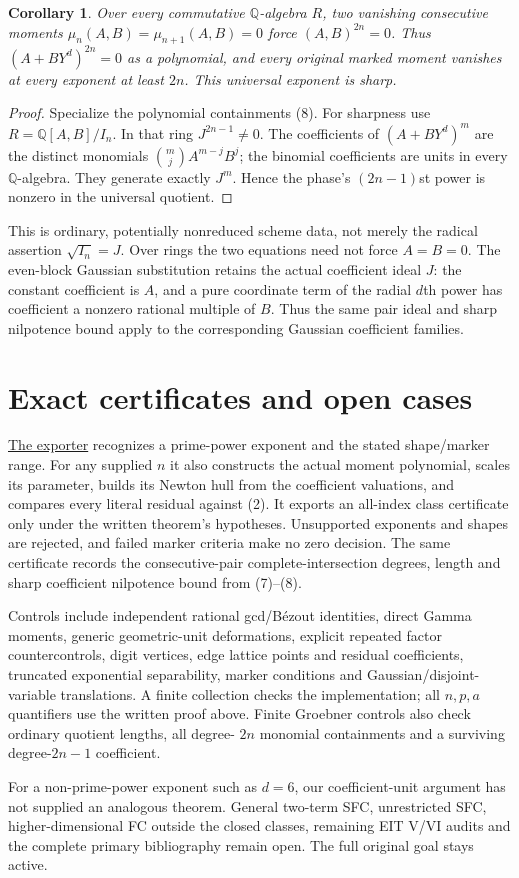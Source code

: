 \documentclass[11pt]{article}
\newtheorem{corollary}[theorem]{Corollary}
\newcommand{\Q}{\mathbb Q}
\begin{document}
\begin{corollary}\label{cor:ordinary}
Over every commutative $\Q$-algebra $R$, two vanishing consecutive moments
$\mu_n(A,B)=\mu_{n+1}(A,B)=0$ force $(A,B)^{2n}=0$.
Thus $(A+BY^d)^{2n}=0$ as a polynomial, and every original marked moment
vanishes at every exponent at least $2n$. This universal exponent is sharp.
\end{corollary}
\begin{proof}
Specialize the polynomial containments (8). For sharpness use
$R=\Q[A,B]/I_n$. In that ring $J^{2n-1}\ne0$. The coefficients of
$(A+BY^d)^m$ are the distinct monomials
$\binom mj A^{m-j}B^j$; the binomial coefficients are units in every
$\Q$-algebra. They generate exactly $J^m$. Hence the phase's
$(2n-1)$st power is nonzero in the universal quotient.
\end{proof}

This is ordinary, potentially nonreduced scheme data, not merely the
radical assertion $\sqrt{I_n}=J$. Over rings the two equations need not
force $A=B=0$. The even-block Gaussian substitution retains the actual
coefficient ideal $J$: the constant coefficient is $A$, and a pure
coordinate term of the radial $d$th power has coefficient a nonzero
rational multiple of $B$. Thus the same pair ideal and sharp nilpotence
bound apply to the corresponding Gaussian coefficient families.

\section{Exact certificates and open cases}
\href{prime_power_windows.py}{The exporter} recognizes a prime-power
exponent and the stated shape/marker range. For any supplied $n$ it also
constructs the actual moment polynomial, scales its parameter, builds
its Newton hull from the coefficient valuations, and compares every
literal residual against (2). It exports an all-index class certificate
only under the written theorem's hypotheses. Unsupported exponents and
shapes are rejected, and failed marker criteria make no zero decision.
The same certificate records the consecutive-pair complete-intersection
degrees, length and sharp coefficient nilpotence bound from (7)--(8).

Controls include independent rational gcd/B\'ezout identities, direct
Gamma moments, generic geometric-unit deformations, explicit repeated
factor countercontrols, digit vertices, edge lattice points and residual
coefficients, truncated exponential separability, marker conditions and
Gaussian/disjoint-variable translations. A finite collection checks the
implementation; all $n,p,a$ quantifiers use the written proof above.
Finite Groebner controls also check ordinary quotient lengths, all degree-
$2n$ monomial containments and a surviving degree-$2n-1$ coefficient.

For a non-prime-power exponent such as $d=6$, our coefficient-unit
argument has not supplied an analogous theorem. General two-term SFC,
unrestricted SFC, higher-dimensional FC outside the closed classes,
remaining EIT V/VI audits and the complete primary bibliography remain
open. The full original goal stays active.
\end{document}
